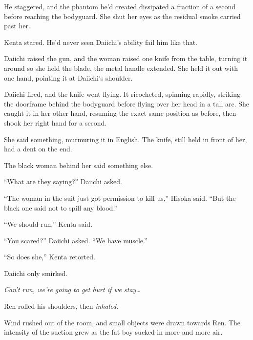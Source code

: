 He staggered, and the phantom he'd created dissipated a fraction of a second before reaching the bodyguard.  She shut her eyes as the residual smoke carried past her.



Kenta stared.  He'd never seen Daiichi's ability fail him like that.



Daiichi raised the gun, and the woman raised one knife from the table, turning it around so she held the blade, the metal handle extended.  She held it out with one hand, pointing it at Daiichi's shoulder.



Daiichi fired, and the knife went flying.  It ricocheted, spinning rapidly, striking the doorframe behind the bodyguard before flying over her head in a tall arc.  She caught it in her other hand, resuming the exact same position as before, then shook her right hand for a second.



She said something, murmuring it in English.  The knife, still held in front of her, had a dent on the end.



The black woman behind her said something else.



``What are they saying?'' Daiichi asked.



``The woman in the suit just got permission to kill us,'' Hisoka said.  ``But the black one said not to spill any blood.''



``We should run,'' Kenta said.



``You scared?'' Daiichi asked.  ``We have muscle.''



``So does she,'' Kenta retorted.



Daiichi only smirked.



\emph{Can't run, we're going to get hurt if we stay\ldots}



Ren rolled his shoulders, then \emph{inhaled}.



Wind rushed out of the room, and small objects were drawn towards Ren.  The intensity of the suction grew as the fat boy sucked in more and more air.



